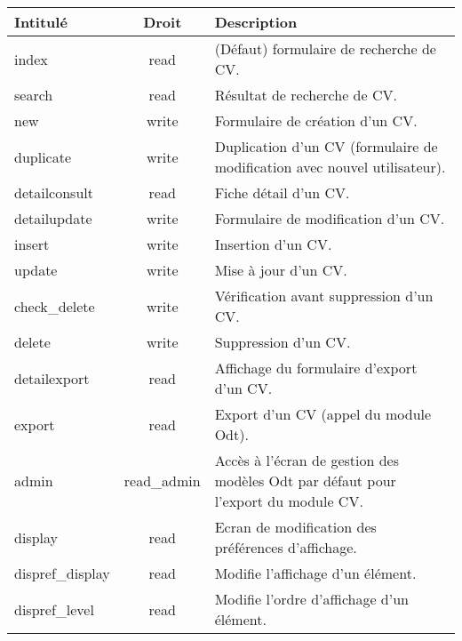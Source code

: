 \begin{tabular}{|l|c|p{9.5cm}|}
 \hline
 \textbf{Intitulé} & \textbf{Droit} & \textbf{Description} \\
 \hline
 \hline
  index & read & (Défaut) formulaire de recherche de CV. \\ 
 \hline
  search & read & Résultat de recherche de CV. \\
 \hline
  new & write & Formulaire de création d'un CV. \\
 \hline
  duplicate & write & Duplication d'un CV (formulaire de modification avec nouvel utilisateur). \\
 \hline
  detailconsult & read & Fiche détail d'un CV. \\
 \hline
  detailupdate & write & Formulaire de modification d'un CV. \\
 \hline
  insert & write & Insertion d'un CV. \\
 \hline
  update & write & Mise à jour d'un CV. \\
 \hline
  check\_delete & write & Vérification avant suppression d'un CV. \\
 \hline
  delete & write & Suppression d'un CV. \\
 \hline
  detailexport & read & Affichage du formulaire d'export d'un CV. \\
 \hline
  export & read & Export d'un CV (appel du module Odt). \\
 \hline
  admin & read\_admin & Accès à l'écran de gestion des modèles Odt par défaut pour l'export du module CV. \\
 \hline
  display & read & Ecran de modification des préférences d'affichage. \\
 \hline
  dispref\_display & read & Modifie l'affichage d'un élément. \\
 \hline
  dispref\_level & read & Modifie l'ordre d'affichage d'un élément. \\
 \hline
\end{tabular}
